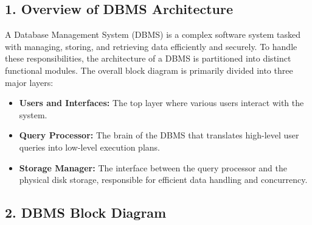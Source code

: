 \documentclass[12pt,a3paper]{article}
\begin{document}
\begin{enumerate}
\begin{tcolorbox}[enhanced,breakable,ansbox,colback=cA!4,colframe=cA,boxrule=0.8pt,arc=5pt,title={\textbf{Answer}},fonttitle=\bfseries\color{white},colbacktitle=cA]

\subsection*{1. Overview of DBMS Architecture}

A Database Management System (DBMS) is a complex software system tasked with managing, storing, and retrieving data efficiently and securely. To handle these responsibilities, the architecture of a DBMS is partitioned into distinct functional modules. The overall block diagram is primarily divided into three major layers:
\begin{itemize}
    \item \textbf{Users and Interfaces:} The top layer where various users interact with the system.
    \item \textbf{Query Processor:} The brain of the DBMS that translates high-level user queries into low-level execution plans.
    \item \textbf{Storage Manager:} The interface between the query processor and the physical disk storage, responsible for efficient data handling and concurrency.
\end{itemize}

\subsection*{2. DBMS Block Diagram}

\vspace{1em}
\begin{center}
\begin{tikzpicture}[
    thick,
    userbox/.style={draw, rectangle, rounded corners=3pt, minimum width=2.8cm, minimum height=1cm, align=center, fill=white, font=\small\bfseries},
    processbox/.style={draw, rectangle, minimum width=3.2cm, minimum height=1.2cm, align=center, fill=white, font=\small\bfseries},
    diskbox/.style={draw, cylinder, shape border rotate=90, aspect=0.25, minimum width=2.2cm, minimum height=1.5cm, align=center, fill=white, font=\footnotesize\bfseries},
    groupbox/.style={draw, rectangle, dashed, gray!80, inner sep=10pt},
    arrow/.style={->, >=latex, thick},
    darrow/.style={<->, >=latex, thick},
    label/.style={font=\bfseries\color{black!70}}
]


\end{tikzpicture}
\end{center}
\end{tcolorbox}
\end{enumerate}
\end{document}
